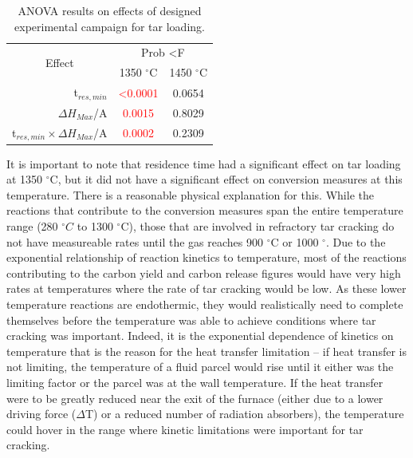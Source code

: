 \documentclass[11pt,twocolumn]{article}
\begin{document}
\begin{table}
	\centering
	\caption{ANOVA results on effects of designed experimental campaign for tar loading.}
	\begin{tabular}{r c c}
		\toprule
		\multicolumn{1}{c}{\multirow{2}{*}{Effect}}		& 	\multicolumn{2}{c}{Prob \textless F	}	\\
		{}								&	1350 $^\circ$C	&	1450 $^\circ$C			\\
		\midrule
		t$_{res,min}$						&	\textcolor{red}{\textless 0.0001}	&	0.0654			\\
		$\Delta H_{Max}$/A					&	\textcolor{red}{0.0015}			&	0.8029			\\
		t$_{res,min}\times \Delta H_{Max}$/A	&	\textcolor{red}{0.0002}			&	0.2309			\\
		\bottomrule
	\end{tabular}
	\label{anova_tar}
\end{table}

It is important to note that residence time had a significant effect on tar loading at 1350 $^\circ$C, but it did not have a significant effect on conversion measures at this temperature.  There is a reasonable physical explanation for this.  While the reactions that contribute to the conversion measures span the entire temperature range (280 $^{\circ}C$ to 1300 $^{\circ}$C), those that are involved in refractory tar cracking do not have measureable rates until the gas reaches 900 $^{\circ}$C or 1000 $^{\circ}$.  Due to the exponential relationship of reaction kinetics to temperature, most of the reactions contributing to the carbon yield and carbon release figures would have very high rates at temperatures where the rate of tar cracking would be low.  As these lower temperature reactions are endothermic, they would realistically need to complete themselves before the temperature was able to achieve conditions where tar cracking was important.  Indeed, it is the exponential dependence of kinetics on temperature that is the reason for the heat transfer limitation -- if heat transfer is not limiting, the temperature of a fluid parcel would rise until it either was the limiting factor or the parcel was at the wall temperature.  If the heat transfer were to be greatly reduced near the exit of the furnace (either due to a lower driving force ($\Delta$T) or a reduced number of radiation absorbers), the temperature could hover in the range where kinetic limitations were important for tar cracking.  
\end{document}
